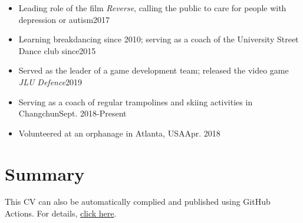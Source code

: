 \documentclass[a4paper,12pt]{article}
\begin{document}
\begin{itemize}[leftmargin=0cm]
\setlength{\itemsep}{-5pt}
\item[] {Leading role} of the film \textit{Reverse}, calling the public to care for people with depression or autism\hfill 2017
\item[] Learning {breakdancing} since 2010; serving as a coach of the University {Street Dance} club since\hfill 2015
\item[] Served as the leader of a game development team; released the video game \textit{JLU Defence}\hfill 2019
\item[] Serving as a coach of regular trampolines and skiing activities in Changchun\hfill Sept. 2018-Present
\item[] Volunteered at an orphanage in Atlanta, USA\hfill Apr. 2018
\end{itemize}


\section{Summary}
This CV can also be automatically complied and published using GitHub Actions. For details, \href{https://github.com/jitinnair1/autoCV}{click here}.


\end{document}
